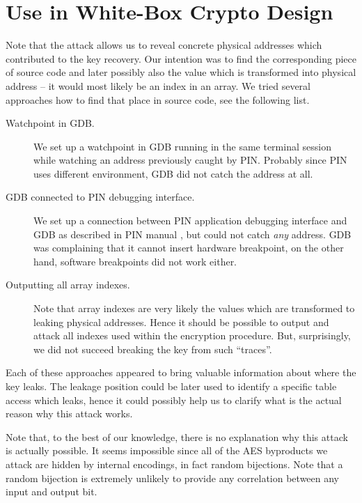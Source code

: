 \section{Use in White-Box Crypto Design}

Note that the attack allows us to reveal concrete physical addresses which contributed to the key recovery. Our intention was to find the corresponding piece of source code and later possibly also the value which is transformed into physical address -- it would most likely be an index in an array. We tried several approaches how to find that place in source code, see the following list.

\begin{description}
	\item[Watchpoint in GDB.]
		We set up a watchpoint in GDB running in the same terminal session while watching an address previously caught by PIN. Probably since PIN uses different environment, GDB did not catch the address at all.
	\item[GDB connected to PIN debugging interface.]
		We set up a connection between PIN application debugging interface and GDB as described in PIN manual \cite{pin214manual}, but could not catch {\em any} address. GDB was complaining that it cannot insert hardware breakpoint, on the other hand, software breakpoints did not work either.
	\item[Outputting all array indexes.]
		Note that array indexes are very likely the values which are transformed to leaking physical addresses. Hence it should be possible to output and attack all indexes used within the encryption procedure. But, surprisingly, we did not succeed breaking the key from such ``traces''.
\end{description}

Each of these approaches appeared to bring valuable information about where the key leaks. The leakage position could be later used to identify a specific table access which leaks, hence it could possibly help us to clarify what is the actual reason why this attack works.

Note that, to the best of our knowledge, there is no explanation why this attack is actually possible. It seems impossible since all of the AES byproducts we attack are hidden by internal encodings, in fact random bijections. Note that a random bijection is extremely unlikely to provide any correlation between any input and output bit.

